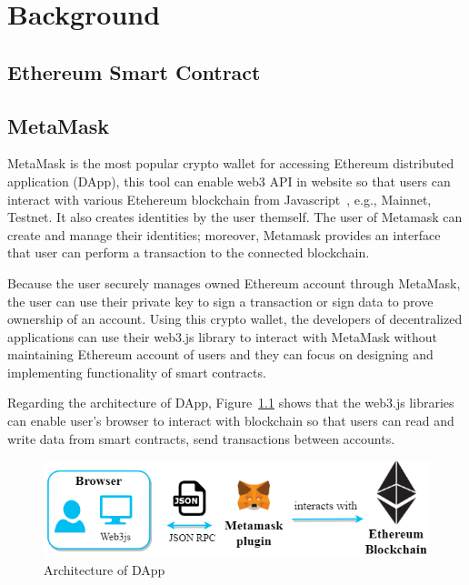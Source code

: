 \chapter{Background}
\label{chapter:background}

\section{Ethereum Smart Contract}

\newpage
\section{MetaMask}
MetaMask is the most popular crypto wallet for accessing Ethereum distributed application (DApp), this tool can enable web3 API in website so that users can interact with various Etehereum blockchain from Javascript~\cite{web3.js}, e.g., Mainnet, Testnet. It also creates identities by the user themself. The user of Metamask can create and manage their identities; moreover, Metamask provides an interface that user can perform a transaction to the connected blockchain.\par
Because the user securely  manages owned Ethereum account through MetaMask, the user can use their private key to sign a transaction or sign data to prove ownership of an account. Using this crypto wallet, the developers of decentralized applications can use their web3.js library to interact with MetaMask without maintaining Ethereum account of users and they can focus on designing and implementing functionality of smart contracts.\par
Regarding the architecture of DApp, Figure~\ref{fig:architecture_of_dapp} shows that the web3.js libraries can enable user's browser to interact with blockchain so that users can read and write data from smart contracts, send transactions between accounts. \par


\begin{figure}[hb]
    \centering
    \includegraphics[height=!,width=1\linewidth,keepaspectratio=true]{figures/architecture_of_dapp.png}
    \caption{{\footnotesize Architecture of DApp}}
    \label{fig:architecture_of_dapp}
\end{figure}

